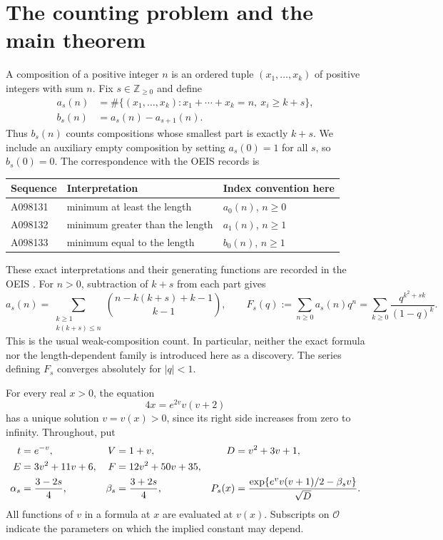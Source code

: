 \documentclass[11pt]{article}
\theoremstyle{remark}\newtheorem{remark}[theorem]{Remark}
\newcommand{\OO}{\mathcal O}
\begin{document}
\section{The counting problem and the main theorem}\label{mlc:sec:main}
A composition of a positive integer $n$ is an ordered tuple $(x_1,\ldots,x_k)$ of positive integers with sum $n$. Fix $s\in\mathbb Z_{\ge0}$ and define
\begin{align}
 a_s(n)&=\#\{(x_1,\ldots,x_k):x_1+\cdots+x_k=n,\ x_i\ge k+s\},\label{mlc:eq:adef}\\
 b_s(n)&=a_s(n)-a_{s+1}(n).\label{mlc:eq:bdef}
\end{align}
Thus $b_s(n)$ counts compositions whose smallest part is exactly $k+s$. We include an auxiliary empty composition by setting $a_s(0)=1$ for all $s$, so $b_s(0)=0$. The correspondence with the OEIS records is
\begin{center}
\begin{tabular}{lll}
\toprule
Sequence & Interpretation & Index convention here\\
\midrule
A098131 & minimum at least the length & $a_0(n)$, $n\ge0$\\
A098132 & minimum greater than the length & $a_1(n)$, $n\ge1$\\
A098133 & minimum equal to the length & $b_0(n)$, $n\ge1$\\
\bottomrule
\end{tabular}
\end{center}
These exact interpretations and their generating functions are recorded in the OEIS \cite{oeis131,oeis132,oeis133}. For $n>0$, subtraction of $k+s$ from each part gives
\begin{equation}\label{mlc:eq:exact}
 a_s(n)=\sum_{\substack{k\ge1\\k(k+s)\le n}}
       \binom{n-k(k+s)+k-1}{k-1},\qquad
 F_s(q):=\sum_{n\ge0}a_s(n)q^n
       =\sum_{k\ge0}\frac{q^{k^2+sk}}{(1-q)^k}.
\end{equation}
This is the usual weak-composition count. In particular, neither the exact formula nor the length-dependent family is introduced here as a discovery. The series defining $F_s$ converges absolutely for $|q|<1$.

For every real $x>0$, the equation
\begin{equation}\label{mlc:eq:vdef}
 4x=e^{2v}v(v+2)
\end{equation}
has a unique solution $v=v(x)>0$, since its right side increases from zero to infinity. Throughout, put
\begin{align}
 t&=e^{-v},&V&=1+v,&D&=v^2+3v+1,\label{mlc:eq:parameters}\\
 E&=3v^2+11v+6,&F&=12v^2+50v+35,\notag\\
 \alpha_s&=\frac{3-2s}{4},&\beta_s&=\frac{3+2s}{4},&
 P_s(x)&=\frac{\exp\{e^v v(v+1)/2-\beta_s v\}}{\sqrt D}.
 \label{mlc:eq:P}
\end{align}
All functions of $v$ in a formula at $x$ are evaluated at $v(x)$. Subscripts on $\OO$ indicate the parameters on which the implied constant may depend.
\end{document}
